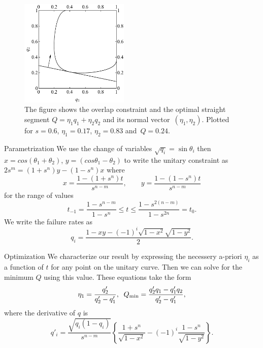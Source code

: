 \documentclass{beamer}
\begin{document}
\begin{frame}
\begin{figure}[t]
\centering
\includegraphics[width=14em]{Figures_CLONEvedit.pdf}
%
\caption{ The figure shows the overlap constraint and the optimal straight segment \mbox{$Q=\eta_1 q_1+\eta_2 q_2$} and its normal vector~$(\eta_1,\eta_2)$. Plotted for  $s = 0.6$, $\eta_1=0.17$, $\eta_2=0.83$ and~$Q=0.24$.}
\label{fig:1}
\end{figure}
\end{frame}
\begin{frame}{Parametrization}
We use the change of variables $\sqrt{q_i} = \sin \theta_i$ then $x = cos(\theta_1 + \theta_2)$, $y = (cos\theta_1 -\theta_2)$ to write the unitary constraint as
$2s^m=(1+s^n)y-(1-s^n)x $ where 
\[x=\frac{1-(1+s^n)t}{s^{n-m}},\qquad y=\frac{1-(1-s^n)t}{s^{n-m}}\]
for the range of values
\[t_{-1}=\frac{1-s^{n-m}}{1-s^n} \leq t \leq \frac{1-s^{2(n-m)}}{1-s^{2n}} = 
t_0.\]
We write the failure rates as
\begin{equation}
q_i=\frac{1-xy-(-1)^i\sqrt{1-x^2}\sqrt{1-y^2}}{2}.
\end{equation}
\end{frame}
\begin{frame}{Optimization}
We characterize our result by expressing the necessery a-priori $\eta_i$ as a function of $t$ for any point on the unitary curve.  Then we can solve for the minimum $Q$ using this value.  These equations take the form
\begin{equation*}
\eta_1=\frac{q'_2}{q'_2-q'_1},\;\; Q_{\rm min}=\frac{q'_2 q_1-q'_1 q_2}{q'_2-q'_1},
\label{main}
\end{equation*}
where the derivative of $q$ is
\begin{equation}
q'_i=\frac{\sqrt{q_i(1-q_i)}}{s^{n-m}}\left\{\frac{1+s^n}{\sqrt{1-x^2}}-(-1)^i\frac{1-s^n}{\sqrt{1-y^2}}\right\}.
\end{equation}
\end{frame}
\end{document}
